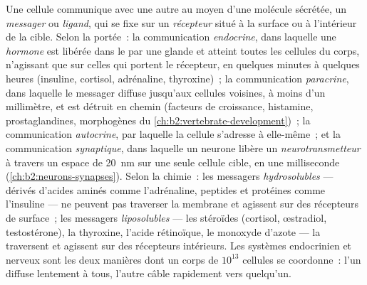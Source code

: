 \begin{definition}\label{def:b2:cell-signalling:kinds}
Une cellule communique avec une autre au moyen d'une molécule sécrétée,
un \emph{messager} ou \emph{ligand}, qui se fixe sur un \emph{récepteur}
situé à la surface ou à l'intérieur de la cible. Selon la portée~: la
communication \emph{endocrine}, dans laquelle une \emph{hormone} est
libérée dans le  par une glande et atteint toutes les cellules du
corps, n'agissant que sur celles qui portent le récepteur, en quelques
minutes à quelques heures (insuline, cortisol, adrénaline, thyroxine)~;
la communication \emph{paracrine}, dans laquelle le messager diffuse
jusqu'aux cellules voisines, à moins d'un millimètre, et est détruit en
chemin (facteurs de croissance, histamine, prostaglandines, morphogènes
du \cref{ch:b2:vertebrate-development})~; la communication
\emph{autocrine}, par laquelle la cellule s'adresse à elle-même~; et la
communication \emph{synaptique}, dans laquelle un neurone libère un
\emph{neurotransmetteur} à travers un espace de \qty{20}{nm} sur une
seule cellule cible, en une milliseconde
(\cref{ch:b2:neurons-synapses}). Selon la chimie~: les messagers
\emph{hydrosolubles} --- dérivés d'acides aminés comme l'adrénaline,
peptides et protéines comme l'insuline --- ne peuvent pas traverser la
membrane et agissent sur des récepteurs de surface~; les messagers
\emph{liposolubles} --- les stéroïdes (cortisol, œstradiol,
testostérone), la thyroxine, l'acide rétinoïque, le monoxyde d'azote ---
la traversent et agissent sur des récepteurs intérieurs. Les systèmes
endocrinien et nerveux sont les deux manières dont un corps de
$10^{13}$ cellules se coordonne~: l'un diffuse lentement à tous, l'autre
câble rapidement vers quelqu'un.
\end{definition}

